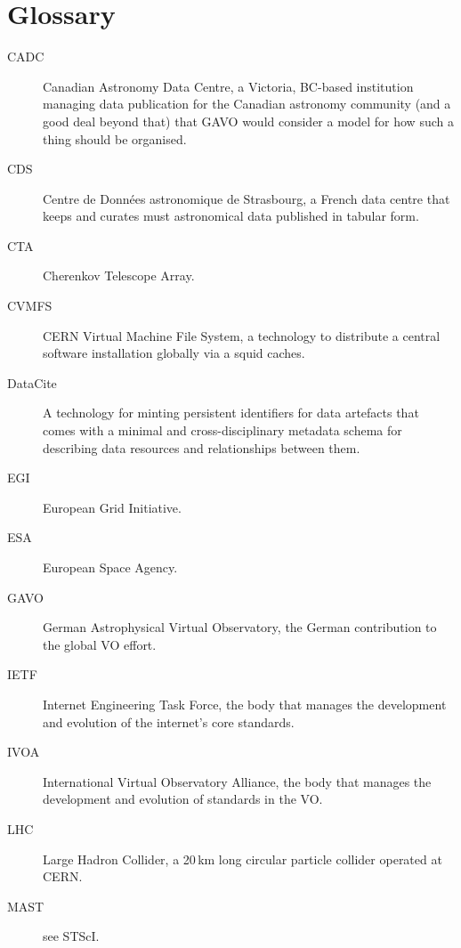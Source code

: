 \section{Glossary}
\label{app:glossary}

\begin{description}
\item[CADC] Canadian Astronomy Data Centre, a Victoria, BC-based
institution managing data publication for the Canadian astronomy
community (and a good deal beyond that) that GAVO would consider a model
for how such a thing should be organised.

\item[CDS] Centre de Donn\'ees astronomique de Strasbourg, a French data
centre that keeps and curates must astronomical data published in
tabular form.

\item[CTA] Cherenkov Telescope Array.

\item[CVMFS] CERN Virtual Machine File System, a technology to distribute a central software installation globally via a squid caches.

\item[DataCite] A technology for minting persistent identifiers for data
artefacts that comes with a minimal and cross-disciplinary metadata
schema for describing data resources and relationships between them.

\item[EGI] European Grid Initiative.

\item[ESA] European Space Agency.

\item[GAVO] German Astrophysical Virtual Observatory, the German
contribution to the global VO effort.

\item[IETF] Internet Engineering Task Force, the body that manages the
development and evolution of the internet's core standards.

\item[IVOA] International Virtual Observatory Alliance, the body that
manages the development and evolution of standards in the VO.

\item[LHC] Large Hadron Collider, a 20\,km long circular particle collider operated at CERN.
 
\item[MAST] see STScI.


\end{description}

